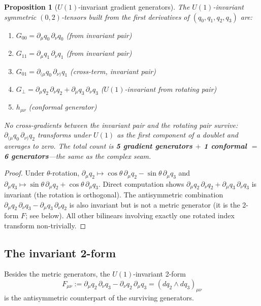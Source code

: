 \documentclass[pdflatex,sn-mathphys-num]{sn-jnl}
\theoremstyle{thmstyleone}%
\newtheorem{proposition}[theorem]{Proposition}
\theoremstyle{thmstyletwo}%
\theoremstyle{thmstylethree}%
\newcommand{\pa}{\partial}
\numberwithin{equation}{section}
\begin{document}
\begin{proposition}[$U(1)$-invariant gradient generators]
\label{prop:u1-generators}
The $U(1)$-invariant symmetric $(0,2)$-tensors built from the first
derivatives of $(q_0,q_1,q_2,q_3)$ are:
\begin{enumerate}[noitemsep,label=(\roman*)]
\item $G_{00} = \pa_\mu q_0\,\pa_\nu q_0$
  \hfill (from invariant pair)
\item $G_{11} = \pa_\mu q_1\,\pa_\nu q_1$
  \hfill (from invariant pair)
\item $G_{01} = \pa_{(\mu}q_0\,\pa_{\nu)}q_1$
  \hfill (cross-term, invariant pair)
\item $G_\perp = \pa_\mu q_2\,\pa_\nu q_2 + \pa_\mu q_3\,\pa_\nu q_3$
  \hfill ($U(1)$-invariant from rotating pair)
\item $h_{\mu\nu}$ \hfill (conformal generator)
\end{enumerate}
No cross-gradients between the invariant pair and the rotating pair
survive: $\pa_{(\mu}q_0\,\pa_{\nu)}q_2$ transforms under $U(1)$ as
the first component of a doublet and averages to zero.
The total count is \textbf{5 gradient generators $+$ 1 conformal
$=$ 6 generators}---the same as the complex seam.
\end{proposition}

\begin{proof}
Under $\theta$-rotation, $\pa_\mu q_2\mapsto \cos\theta\,\pa_\mu q_2
- \sin\theta\,\pa_\mu q_3$ and
$\pa_\mu q_3\mapsto\sin\theta\,\pa_\mu q_2
+ \cos\theta\,\pa_\mu q_3$.  Direct computation shows
$\pa_\mu q_2\,\pa_\nu q_2 + \pa_\mu q_3\,\pa_\nu q_3$ is invariant
(the rotation is orthogonal).  The antisymmetric combination
$\pa_\mu q_2\,\pa_\nu q_3 - \pa_\mu q_3\,\pa_\nu q_2$ is also
invariant but is not a metric generator (it is the 2-form $F$;
see below).  All other bilinears involving exactly one rotated
index transform non-trivially.
\end{proof}

\subsection{The invariant 2-form}

Besides the metric generators, the $U(1)$-invariant 2-form
\begin{equation}
\label{eq:u1-Fform}
F_{\mu\nu} := \pa_\mu q_2\,\pa_\nu q_3 - \pa_\nu q_2\,\pa_\mu q_3
            = (dq_2\wedge dq_3)_{\mu\nu}
\end{equation}
is the antisymmetric counterpart of the surviving generators.
\end{document}
